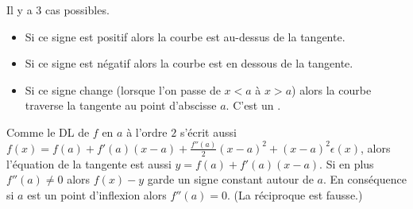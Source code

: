 \documentclass[class=report,crop=false]{standalone}
\begin{document}
Il y a $3$ cas possibles.
\begin{itemize}
  \item Si ce signe est positif alors la courbe est au-dessus de la tangente.
  \item Si ce signe est négatif alors la courbe est en dessous de la tangente.
  \item Si ce signe change (lorsque l'on passe de $x<a$ à $x>a$) alors la courbe traverse
la tangente au point d'abscisse $a$. C'est un .
\end{itemize}

Comme le DL de $f$ en $a$ à l'ordre $2$ s’écrit aussi
$f(x)=f(a)+f'(a)(x-a) + \frac{f''(a)}{2}(x-a)^2 + (x-a)^2\epsilon(x)$,
alors l'équation de la tangente est aussi $y=f(a)+f'(a)(x-a)$.
Si en plus $f''(a)\neq 0$ alors $f(x)-y$ garde un signe constant autour de $a$.
En conséquence si $a$ est un point d'inflexion alors $f''(a)=0$. (La réciproque est fausse.)
\end{document}
